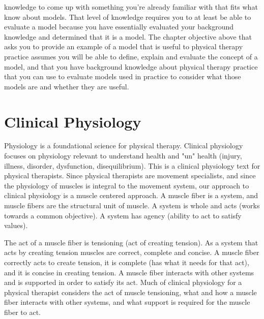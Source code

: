 knowledge to come up with something you're already familiar with that fits what know about models. That level of knowledge requires you to at least be able to evaluate a model because you have essentially evaluated your background knowledge and determined that it is a model. The chapter objective above that asks you to provide an example of a model that is useful to physical therapy practice assumes you will be able to define, explain and evaluate the concept of a model, and that you have background knowledge about physical therapy practice that you can use to evaluate models used in practice to consider what those models are and whether they are useful. 

\section{Clinical Physiology}

Physiology is a foundational science for physical therapy. Clinical physiology focuses on physiology relevant to understand health and "un" health (injury, illness, disorder, dysfunction, disequilibrium). This is a clinical physiology text for physical therapists. Since physical therapists are movement specialists, and since the physiology of muscles is integral to the movement system, our approach to clinical physiology is a muscle centered approach.  A muscle fiber\footnotemark{} is a system, and muscle fibers are the structural unit of muscle. A system is whole and acts (works towards a common objective). A system has agency (ability to act to satisfy values). 


The act of a muscle fiber is tensioning (act of creating tension). As a system that acts by creating tension muscles are correct, complete and concise. A muscle fiber correctly acts to create tension, it is complete (has what it needs for that act), and it is concise in creating tension. A muscle fiber interacts with other systems and is supported in order to satisfy its act. Much of clinical physiology for a physical therapist considers the act of muscle tensioning, what and how a muscle fiber interacts with other systems, and what support is required for the muscle fiber to act.

